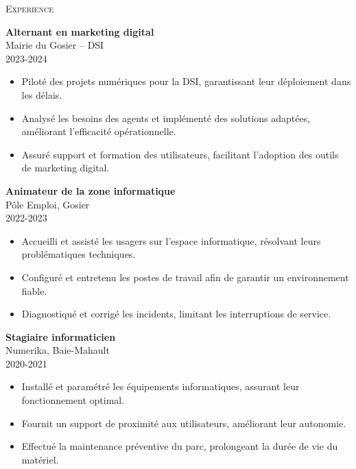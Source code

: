 \documentclass[11pt,a4paper]{article}
\newcommand{\headright}[1]{\vspace*{2.5ex}\textsc{\Large\color{cvblue}#1}\par%
  \vspace*{-2ex}{\color{cvblue}\hrulefill}\par}
\begin{document}
\begin{minipage}[t]{0.56\textwidth}
  \setlength{\parskip}{0.8ex}
  \vspace{2ex}

  \headright{Experience}
  
\colorbox{maincolor}{%
  \begin{minipage}{\linewidth}
    \textbf{Alternant en marketing digital} \\ Mairie du Gosier – DSI \\ 2023-2024
    \begin{itemize}
      \item Piloté des projets numériques pour la DSI, garantissant leur déploiement dans les délais. \item Analysé les besoins des agents et implémenté des solutions adaptées, améliorant l’efficacité opérationnelle. \item Assuré support et formation des utilisateurs, facilitant l’adoption des outils de marketing digital.
    \end{itemize}
  \end{minipage}}

\vspace{3mm}


\colorbox{maincolor}{%
  \begin{minipage}{\linewidth}
    \textbf{Animateur de la zone informatique} \\ Pôle Emploi, Gosier \\ 2022-2023
    \begin{itemize}
      \item Accueilli et assisté les usagers sur l’espace informatique, résolvant leurs problématiques techniques. \item Configuré et entretenu les postes de travail afin de garantir un environnement fiable. \item Diagnostiqué et corrigé les incidents, limitant les interruptions de service.
    \end{itemize}
  \end{minipage}}

\vspace{3mm}


\colorbox{maincolor}{%
  \begin{minipage}{\linewidth}
    \textbf{Stagiaire informaticien} \\ Numerika, Baie-Mahault \\ 2020-2021
    \begin{itemize}
      \item Installé et paramétré les équipements informatiques, assurant leur fonctionnement optimal. \item Fournit un support de proximité aux utilisateurs, améliorant leur autonomie. \item Effectué la maintenance préventive du parc, prolongeant la durée de vie du matériel.
    \end{itemize}
  \end{minipage}}        %


\end{minipage}
\end{document}
